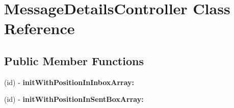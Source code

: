 \hypertarget{interface_message_details_controller}{
\section{\-Message\-Details\-Controller \-Class \-Reference}
\label{interface_message_details_controller}
}
\subsection*{\-Public \-Member \-Functions}
\begin{DoxyCompactItemize}
\item 
\hypertarget{interface_message_details_controller_a08fdc227783c578fc46e578d3c1eb882}{
(id) -\/ {\bfseries init\-With\-Position\-In\-Inbox\-Array\-:}}
\label{interface_message_details_controller_a08fdc227783c578fc46e578d3c1eb882}

\item 
\hypertarget{interface_message_details_controller_a08442dd528a81fecd14c4eb48a78d20c}{
(id) -\/ {\bfseries init\-With\-Position\-In\-Sent\-Box\-Array\-:}}
\label{interface_message_details_controller_a08442dd528a81fecd14c4eb48a78d20c}

\end{DoxyCompactItemize}
